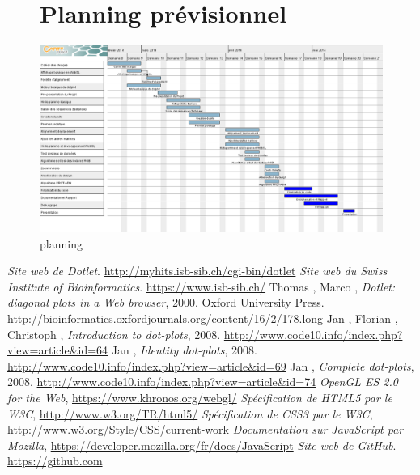 \documentclass{report}
\begin{document}
\begin{figure}
\chapter{Planning prévisionnel}
\centerline{\includegraphics[scale=0.55]{planning.png}}
\caption{planning}
\end{figure}

\begin{thebibliography}{9}
  \emph{Site web de Dotlet}.
  \url{http://myhits.isb-sib.ch/cgi-bin/dotlet}
  \emph{Site web du Swiss Institute of Bioinformatics}.
  \url{https://www.isb-sib.ch/}
  Thomas , Marco ,
  \emph{Dotlet: diagonal plots in a Web browser},
  2000. Oxford University Press.
  \url{http://bioinformatics.oxfordjournals.org/content/16/2/178.long}
  Jan , Florian , Christoph ,
  \emph{Introduction to dot-plots},
  2008.
  \url{http://www.code10.info/index.php?view=article&id=64}
  Jan ,
  \emph{Identity dot-plots},
  2008.
  \url{http://www.code10.info/index.php?view=article&id=69}
  Jan ,
  \emph{Complete dot-plots},
  2008.
  \url{http://www.code10.info/index.php?view=article&id=74}
  \emph{OpenGL ES 2.0 for the Web},
  \url{https://www.khronos.org/webgl/}
  \emph{Spécification de HTML5 par le W3C},
  \url{http://www.w3.org/TR/html5/}
  \emph{Spécification de CSS3 par le W3C},
  \url{http://www.w3.org/Style/CSS/current-work}
  \emph{Documentation sur JavaScript par Mozilla},
  \url{https://developer.mozilla.org/fr/docs/JavaScript}
  \emph{Site web de GitHub}.
  \url{https://github.com}
\end{thebibliography}
\end{document}
